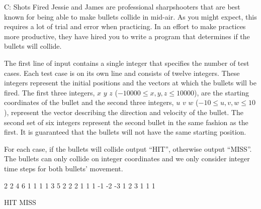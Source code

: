\begin{problem}{C: Shots Fired}
Jessie and James are professional sharpshooters that are best known for being able to make bullets collide in mid-air.
As you might expect, this requires a lot of trial and error when practicing.
In an effort to make practices more productive, they have hired you to write a program that determines if the bullets will collide.
\end{problem}

\begin{formalin}
The first line of input contains a single integer that specifies the number of test cases.
Each test case is on its own line and consists of twelve integers.
These integers represent the initial positions and the vectors at which the bullets will be fired.
The first three integers, $x$ $y$ $z$ ($-10000 \leq x, y, z \leq 10000$), are the starting coordinates of the bullet and the second three integers, $u$ $v$ $w$ ($-10 \leq u, v, w \leq 10$), represent the vector describing the direction and velocity of the bullet.
The second set of six integers represent the second bullet in the same fashion as the first.
It is guaranteed that the bullets will not have the same starting position.
\end{formalin}

\begin{formalout}
For each case, if the bullets will collide output ``HIT'', otherwise output ``MISS''.
The bullets can only collide on integer coordinates and we only consider integer time steps for both bullets' movement. 
\end{formalout}

\begin{datain}
2
2 4 6 1 1 1 1 3 5 2 2 2
1 1 1 -1 -2 -3 1 2 3 1 1 1
\end{datain}

\begin{dataout}
HIT
MISS
\end{dataout}

